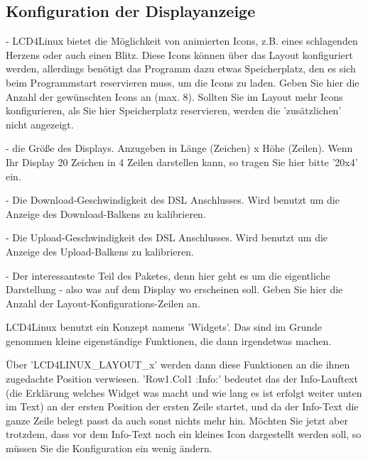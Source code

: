 \subsection{Konfiguration der Displayanzeige}

\begin{description}
  - LCD4Linux bietet die Möglichkeit von animierten Icons, z.B. eines schlagenden
  Herzens oder auch einen Blitz. Diese Icons können über das Layout konfiguriert
  werden, allerdings benötigt das Programm dazu etwas Speicherplatz, den es sich
  beim Programmstart reservieren muss, um die Icons zu laden. Geben Sie hier die
  Anzahl der gewünschten Icons an (max. 8). Sollten Sie im Layout mehr Icons
  konfigurieren, als Sie hier Speicherplatz reservieren, werden die 'zusätzlichen'
  nicht angezeigt.

  - die Größe des Displays. Anzugeben in Länge (Zeichen) x Höhe (Zeilen). Wenn Ihr
  Display 20 Zeichen in 4 Zeilen darstellen kann, so tragen Sie hier bitte '20x4'
  ein.

  - Die Download-Geschwindigkeit des DSL Anschlusses. Wird benutzt um die Anzeige
  des Download-Balkens zu kalibrieren.
  
  - Die Upload-Geschwindigkeit des DSL Anschlusses. Wird benutzt um die Anzeige
  des Upload-Balkens zu kalibrieren.

  - Der interessanteste Teil des Paketes, denn hier geht es um die eigentliche
  Darstellung - also was auf dem Display wo erscheinen soll. Geben Sie hier die
  Anzahl der Layout-Konfigurations-Zeilen an.

  LCD4Linux benutzt ein Konzept namens 'Widgets'. Das sind im Grunde genommen
  kleine eigenständige Funktionen, die dann irgendetwas machen.

  Über 'LCD4LINUX\_LAYOUT\_x' werden dann diese Funktionen an die ihnen zugedachte
  Position verwiesen. 
  'Row1.Col1  :Info:' bedeutet das der Info-Lauftext (die Erklärung welches 
  Widget was macht und wie lang es ist erfolgt weiter unten im Text) an der ersten
  Position der ersten Zeile startet, und da der Info-Text die ganze Zeile belegt
  passt da auch sonst nichts mehr hin. 
  Möchten Sie jetzt aber trotzdem, dass vor dem Info-Text noch ein kleines Icon 
  dargestellt werden soll, so müssen Sie die Konfiguration ein wenig ändern.


\end{description}
